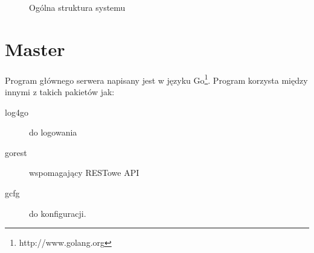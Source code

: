 \documentclass[paper=a4, fontsize=11pt]{scrartcl} %
\numberwithin{equation}{section} %
\numberwithin{figure}{section} %
\numberwithin{table}{section} %
\begin{document}
\begin{figure}[t]
	\begin{center}
		\caption{Ogólna struktura systemu}
	\end{center}
\end{figure}
\clearpage

\section{Master}

	Program głównego serwera napisany jest w języku Go\footnote{http://www.golang.org}. 
	Program korzysta między innymi z takich pakietów jak:
	\begin{description}
		 \item[log4go] do logowania
		 \item[gorest] wspomagający RESTowe API 
		 \item[gcfg] do konfiguracji.
	\end{description}		
	
\end{document}
